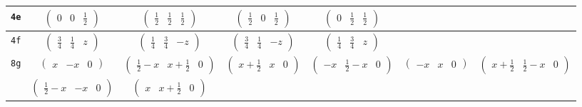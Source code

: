 \documentclass[fleqn,9pt,landscape]{jsarticle}
\begin{document}
\begin{center}
\begin{longtable}{ccccccc}
{\tt 4e} & $ \begin{pmatrix} 0 & 0 & \frac{1}{2} \end{pmatrix} $ & $ \begin{pmatrix} \frac{1}{2} & \frac{1}{2} & \frac{1}{2} \end{pmatrix} $ & $ \begin{pmatrix} \frac{1}{2} & 0 & \frac{1}{2} \end{pmatrix} $ & $ \begin{pmatrix} 0 & \frac{1}{2} & \frac{1}{2} \end{pmatrix} $ & $  $ & $  $ \\ \hline
{\tt 4f} & $ \begin{pmatrix} \frac{3}{4} & \frac{1}{4} & z \end{pmatrix} $ & $ \begin{pmatrix} \frac{1}{4} & \frac{3}{4} & - z \end{pmatrix} $ & $ \begin{pmatrix} \frac{3}{4} & \frac{1}{4} & - z \end{pmatrix} $ & $ \begin{pmatrix} \frac{1}{4} & \frac{3}{4} & z \end{pmatrix} $ & $  $ & $  $ \\ \hline
{\tt 8g} & $ \begin{pmatrix} x & - x & 0 \end{pmatrix} $ & $ \begin{pmatrix} \frac{1}{2} - x & x + \frac{1}{2} & 0 \end{pmatrix} $ & $ \begin{pmatrix} x + \frac{1}{2} & x & 0 \end{pmatrix} $ & $ \begin{pmatrix} - x & \frac{1}{2} - x & 0 \end{pmatrix} $ & $ \begin{pmatrix} - x & x & 0 \end{pmatrix} $ & $ \begin{pmatrix} x + \frac{1}{2} & \frac{1}{2} - x & 0 \end{pmatrix} $ \\
& $ \begin{pmatrix} \frac{1}{2} - x & - x & 0 \end{pmatrix} $ & $ \begin{pmatrix} x & x + \frac{1}{2} & 0 \end{pmatrix} $ & $  $ & $  $ & $  $ & $  $ \\ \hline

\end{longtable}
\end{center}
\end{document}
